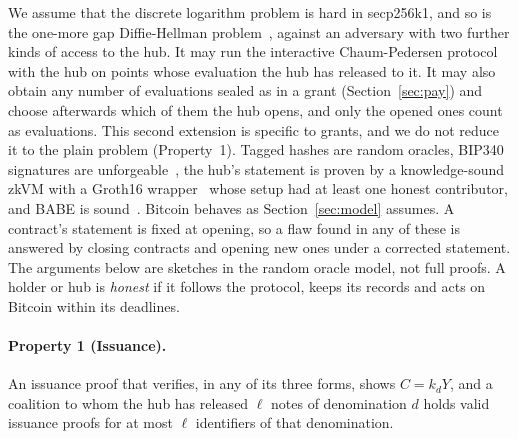 \documentclass[11pt]{article}
\newcommand{\prop}[2]{\paragraph{Property #1 (#2).}}
\begin{document}
We assume that the discrete logarithm problem is hard in secp256k1, and so is the one-more gap Diffie-Hellman problem~\cite{jkk,privacypass}, against an adversary with two further kinds of access to the hub. It may run the interactive Chaum-Pedersen protocol with the hub on points whose evaluation the hub has released to it. It may also obtain any number of evaluations sealed as in a grant (Section~\ref{sec:pay}) and choose afterwards which of them the hub opens, and only the opened ones count as evaluations. This second extension is specific to grants, and we do not reduce it to the plain problem (Property~1). Tagged hashes are random oracles, BIP340 signatures are unforgeable~\cite{bip340}, the hub's statement is proven by a knowledge-sound zkVM with a Groth16 wrapper~\cite{risc0,groth16} whose setup had at least one honest contributor, and BABE is sound~\cite{babe}. Bitcoin behaves as Section~\ref{sec:model} assumes. A contract's statement is fixed at opening, so a flaw found in any of these is answered by closing contracts and opening new ones under a corrected statement. The arguments below are sketches in the random oracle model, not full proofs. A holder or hub is \emph{honest} if it follows the protocol, keeps its records and acts on Bitcoin within its deadlines.

\prop{1}{Issuance} An issuance proof that verifies, in any of its three forms, shows $C=k_dY$, and a coalition to whom the hub has released $\ell$ notes of denomination $d$ holds valid issuance proofs for at most $\ell$ identifiers of that denomination.
\end{document}
